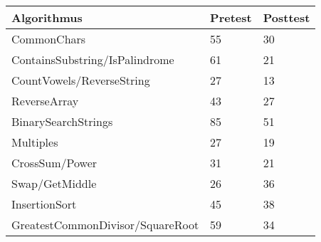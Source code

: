 \begin{tabular}{lll}
\toprule
                     Algorithmus &  Pretest &  Posttest \\
\midrule
                     CommonChars &       55 &        30 \\
  ContainsSubstring/IsPalindrome &       61 &        21 \\
       CountVowels/ReverseString &       27 &        13 \\
                    ReverseArray &       43 &        27 \\
             BinarySearchStrings &       85 &        51 \\
                       Multiples &       27 &        19 \\
                  CrossSum/Power &       31 &        21 \\
                  Swap/GetMiddle &       26 &        36 \\
                   InsertionSort &       45 &        38 \\
GreatestCommonDivisor/SquareRoot &       59 &        34 \\
\bottomrule
\end{tabular}

